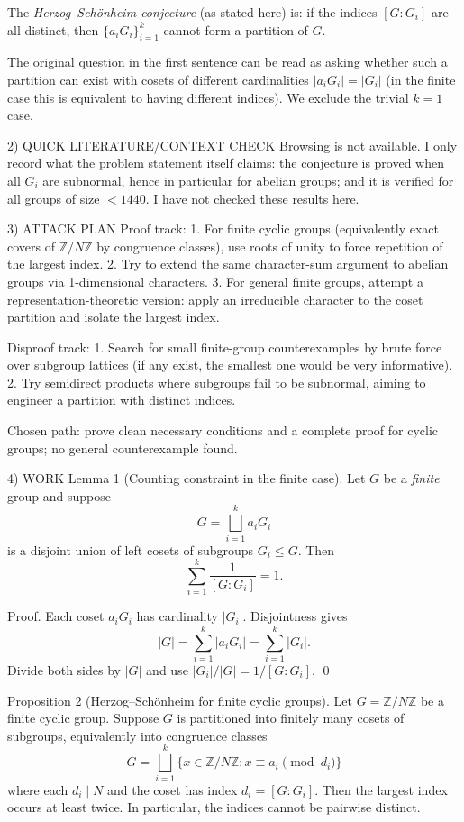 The \emph{Herzog--Sch\"onheim conjecture} (as stated here) is:
if the indices $[G:G_i]$ are all distinct, then $\{a_iG_i\}_{i=1}^k$ cannot form a partition of $G$.

The original question in the first sentence can be read as asking whether such a partition can exist with cosets
of different cardinalities $|a_iG_i|=|G_i|$ (in the finite case this is equivalent to having different indices).
We exclude the trivial $k=1$ case.

2) QUICK LITERATURE/CONTEXT CHECK
Browsing is not available. I only record what the problem statement itself claims:
the conjecture is proved when all $G_i$ are subnormal, hence in particular for abelian groups; and it is verified
for all groups of size $<1440$. I have not checked these results here.

3) ATTACK PLAN
Proof track:
1. For finite cyclic groups (equivalently exact covers of $\mathbb{Z}/N\mathbb{Z}$ by congruence classes), use roots of unity to force repetition of the largest index.
2. Try to extend the same character-sum argument to abelian groups via 1-dimensional characters.
3. For general finite groups, attempt a representation-theoretic version: apply an irreducible character to the coset partition and isolate the largest index.

Disproof track:
1. Search for small finite-group counterexamples by brute force over subgroup lattices (if any exist, the smallest one would be very informative).
2. Try semidirect products where subgroups fail to be subnormal, aiming to engineer a partition with distinct indices.

Chosen path: prove clean necessary conditions and a complete proof for cyclic groups; no general counterexample found.

4) WORK
Lemma 1 (Counting constraint in the finite case).
Let $G$ be a \emph{finite} group and suppose
\[G=\bigsqcup_{i=1}^k a_iG_i\]
is a disjoint union of left cosets of subgroups $G_i\le G$. Then
\[\sum_{i=1}^k \frac{1}{[G:G_i]}=1.\]

Proof.
Each coset $a_iG_i$ has cardinality $|G_i|$. Disjointness gives
\[|G|=\sum_{i=1}^k |a_iG_i|=\sum_{i=1}^k |G_i|.\]
Divide both sides by $|G|$ and use $|G_i|/|G|=1/[G:G_i]$. \qed

Proposition 2 (Herzog--Sch\"onheim for finite cyclic groups).
Let $G=\mathbb{Z}/N\mathbb{Z}$ be a finite cyclic group. Suppose $G$ is partitioned into finitely many cosets of subgroups,
equivalently into congruence classes
\[G=\bigsqcup_{i=1}^k \{x\in \mathbb{Z}/N\mathbb{Z}: x\equiv a_i \!\!\!\pmod{d_i}\}\]
where each $d_i\mid N$ and the coset has index $d_i=[G:G_i]$. Then the largest index occurs at least twice.
In particular, the indices cannot be pairwise distinct.

